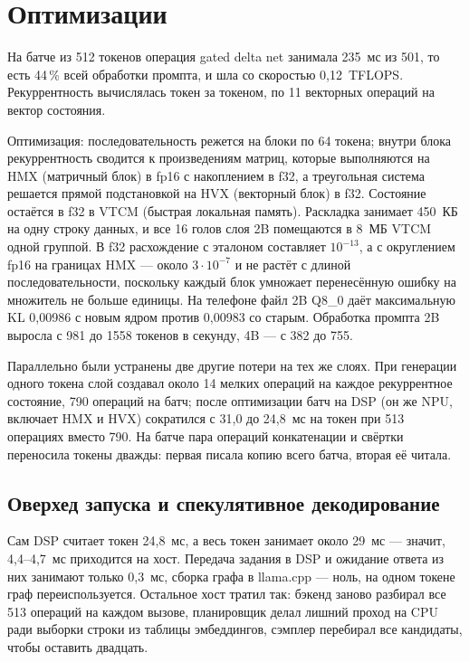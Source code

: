 \documentclass[11pt]{article}
\begin{document}
\section{Оптимизации}

На батче из 512 токенов операция gated delta net занимала 235~мс из 501, то
есть 44\,\% всей обработки промпта, и шла со скоростью 0{,}12~TFLOPS.
Рекуррентность вычислялась токен за токеном, по 11 векторных операций на
вектор состояния.

Оптимизация: последовательность режется на блоки по 64 токена; внутри блока
рекуррентность сводится к произведениям матриц, которые выполняются на HMX
(матричный блок) в fp16 с накоплением в f32, а треугольная система решается
прямой подстановкой на HVX (векторный блок) в f32. Состояние остаётся в f32 в
VTCM (быстрая локальная память). Раскладка
занимает 450~КБ на одну строку данных, и все 16 голов слоя 2B помещаются в
8~МБ VTCM одной группой. В f32 расхождение с эталоном составляет $10^{-13}$, а
с округлением fp16 на границах HMX --- около $3\cdot10^{-7}$ и не растёт с
длиной последовательности, поскольку каждый блок умножает перенесённую ошибку
на множитель не больше единицы. На телефоне файл 2B Q8\_0 даёт максимальную KL
0{,}00986 с новым ядром против 0{,}00983 со старым. Обработка промпта 2B
выросла с 981 до 1558 токенов в секунду, 4B --- с 382 до 755.

Параллельно были устранены две другие потери на тех же слоях. При генерации
одного токена слой создавал около 14 мелких операций на каждое рекуррентное
состояние, 790 операций на батч; после оптимизации батч на DSP (он же NPU, включает HMX и HVX) сократился с
31{,}0 до 24{,}8~мс на токен при 513 операциях вместо 790. На батче пара
операций конкатенации и свёртки переносила токены дважды: первая писала копию
всего батча, вторая её читала.

\subsection{Оверхед запуска и спекулятивное декодирование}

Сам DSP считает токен 24{,}8~мс, а весь токен занимает около 29~мс --- значит,
4{,}4--4{,}7~мс приходится на хост. Передача задания в DSP и ожидание ответа
из них занимают только 0{,}3~мс, сборка графа в llama.cpp --- ноль, на одном
токене граф переиспользуется. Остальное хост тратил так: бэкенд заново разбирал
все 513 операций на каждом вызове, планировщик делал лишний проход на CPU ради
выборки строки из таблицы эмбеддингов, сэмплер перебирал все
кандидаты, чтобы оставить двадцать.
\end{document}
